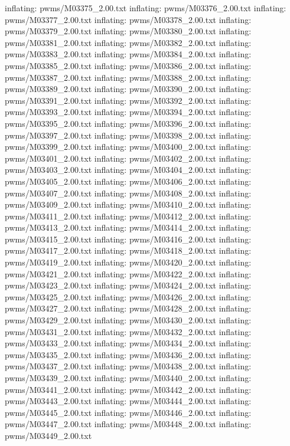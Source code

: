 \documentclass[letterpaper,10pt,english]{sphinxmanual}
\begin{document}
{\begin{sphinxVerbatim}[commandchars=\\\{\}]
  inflating: pwms/M03375\_2.00.txt
  inflating: pwms/M03376\_2.00.txt
  inflating: pwms/M03377\_2.00.txt
  inflating: pwms/M03378\_2.00.txt
  inflating: pwms/M03379\_2.00.txt
  inflating: pwms/M03380\_2.00.txt
  inflating: pwms/M03381\_2.00.txt
  inflating: pwms/M03382\_2.00.txt
  inflating: pwms/M03383\_2.00.txt
  inflating: pwms/M03384\_2.00.txt
  inflating: pwms/M03385\_2.00.txt
  inflating: pwms/M03386\_2.00.txt
  inflating: pwms/M03387\_2.00.txt
  inflating: pwms/M03388\_2.00.txt
  inflating: pwms/M03389\_2.00.txt
  inflating: pwms/M03390\_2.00.txt
  inflating: pwms/M03391\_2.00.txt
  inflating: pwms/M03392\_2.00.txt
  inflating: pwms/M03393\_2.00.txt
  inflating: pwms/M03394\_2.00.txt
  inflating: pwms/M03395\_2.00.txt
  inflating: pwms/M03396\_2.00.txt
  inflating: pwms/M03397\_2.00.txt
  inflating: pwms/M03398\_2.00.txt
  inflating: pwms/M03399\_2.00.txt
  inflating: pwms/M03400\_2.00.txt
  inflating: pwms/M03401\_2.00.txt
  inflating: pwms/M03402\_2.00.txt
  inflating: pwms/M03403\_2.00.txt
  inflating: pwms/M03404\_2.00.txt
  inflating: pwms/M03405\_2.00.txt
  inflating: pwms/M03406\_2.00.txt
  inflating: pwms/M03407\_2.00.txt
  inflating: pwms/M03408\_2.00.txt
  inflating: pwms/M03409\_2.00.txt
  inflating: pwms/M03410\_2.00.txt
  inflating: pwms/M03411\_2.00.txt
  inflating: pwms/M03412\_2.00.txt
  inflating: pwms/M03413\_2.00.txt
  inflating: pwms/M03414\_2.00.txt
  inflating: pwms/M03415\_2.00.txt
  inflating: pwms/M03416\_2.00.txt
  inflating: pwms/M03417\_2.00.txt
  inflating: pwms/M03418\_2.00.txt
  inflating: pwms/M03419\_2.00.txt
  inflating: pwms/M03420\_2.00.txt
  inflating: pwms/M03421\_2.00.txt
  inflating: pwms/M03422\_2.00.txt
  inflating: pwms/M03423\_2.00.txt
  inflating: pwms/M03424\_2.00.txt
  inflating: pwms/M03425\_2.00.txt
  inflating: pwms/M03426\_2.00.txt
  inflating: pwms/M03427\_2.00.txt
  inflating: pwms/M03428\_2.00.txt
  inflating: pwms/M03429\_2.00.txt
  inflating: pwms/M03430\_2.00.txt
  inflating: pwms/M03431\_2.00.txt
  inflating: pwms/M03432\_2.00.txt
  inflating: pwms/M03433\_2.00.txt
  inflating: pwms/M03434\_2.00.txt
  inflating: pwms/M03435\_2.00.txt
  inflating: pwms/M03436\_2.00.txt
  inflating: pwms/M03437\_2.00.txt
  inflating: pwms/M03438\_2.00.txt
  inflating: pwms/M03439\_2.00.txt
  inflating: pwms/M03440\_2.00.txt
  inflating: pwms/M03441\_2.00.txt
  inflating: pwms/M03442\_2.00.txt
  inflating: pwms/M03443\_2.00.txt
  inflating: pwms/M03444\_2.00.txt
  inflating: pwms/M03445\_2.00.txt
  inflating: pwms/M03446\_2.00.txt
  inflating: pwms/M03447\_2.00.txt
  inflating: pwms/M03448\_2.00.txt
  inflating: pwms/M03449\_2.00.txt

\end{sphinxVerbatim}}
\end{document}
